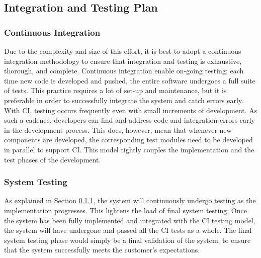 \subsection{Integration and Testing Plan} \label{sect:ITP}
\subsubsection{Continuous Integration}
\label{sect:CI}
\noindent
Due to the complexity and size of this effort, it is best to adopt a continuous integration methodology to ensure that integration and testing is exhaustive, thorough, and complete. Continuous integration enable on-going testing; each time new code is developed and pushed, the entire software undergoes a full suite of tests. This practice requires a lot of set-up and maintenance, but it is preferable in order to successfully integrate the system and catch errors early.\\
\smallskip
With CI, testing occurs frequently even with small increments of development. As such a cadence, developers can find and address code and integration errors early in the development process. This does, however, mean that whenever new components are developed, the corresponding test modules need to be developed in parallel to support CI. This model tightly couples the implementation and the test phases of the development.

\subsubsection{System Testing}
As explained in Section \ref{sect:CI}, the system will continuously undergo testing as the implementation progresses. This lightens the load of final system testing. Once the system has been fully implemented and integrated with the CI testing model, the system will have undergone and passed all the CI tests as a whole. The final system testing phase would simply be a final validation of the system; to ensure that the system successfully meets the customer's expectations. 